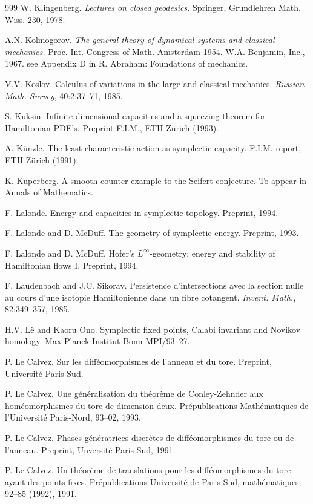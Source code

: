 \begin{thebibliography}{999}
 W. Klingenberg. \emph{Lectures on closed geodesics.}
Springer, Grundlehren Math. Wiss. 230, 1978.

 A.N. Kolmogorov. \emph{The general theory of dynamical
systems and classical mechanics.} Proc. Int. Congress of Math.
Amsterdam 1954. W.A. Benjamin, Inc., 1967. see Appendix D in R. Abraham:
Foundations of mechanics.

 V.V. Koslov. Calculus of variations in the large and
classical mechanics. \emph{Russian Math. Survey}, 40:2:37--71, 1985.

 S. Kuksin. Infinite-dimensional capacities and a squeezing
theorem for Hamiltonian PDE's. Preprint F.I.M., ETH Zürich (1993).

 A. Künzle. The least characteristic action as symplectic
capacity. F.I.M. report, ETH Zürich (1991).

 K. Kuperberg. A smooth counter example to the Seifert
conjecture. To appear in Annals of Mathematics.

 F. Lalonde. Energy and capacities in symplectic topology.
Preprint, 1994.

 F. Lalonde and D. McDuff. The geometry of symplectic
energy. Preprint, 1993.

 F. Lalonde and D. McDuff. Hofer's $L^\infty$-geometry:
energy and stability of Hamiltonian flows I. Preprint, 1994.

 F. Laudenbach and J.C. Sikorav. Persistence d'intersections
avec la section nulle au cours d'une isotopie Hamiltonienne dans un
fibre cotangent. \emph{Invent. Math.}, 82:349--357, 1985.

 H.V. Lê and Kaoru Ono. Symplectic fixed points, Calabi
invariant and Novikov homology. Max-Planck-Institut Bonn MPI/93--27.

 P. Le Calvez. Sur les difféomorphismes de l'anneau et du
tore. Preprint, Université Paris-Sud.

 P. Le Calvez. Une généralisation du théorème de
Conley-Zehnder aux homéomorphismes du tore de dimension deux.
Prépublications Mathématiques de l'Université Paris-Nord, 93--02, 1993.

 P. Le Calvez. Phases génératrices discrètes de
difféomorphismes du tore ou de l'anneau. Preprint, Unversité Paris-Sud,
1991.

 P. Le Calvez. Un théorème de translations pour les
difféomorphismes du tore ayant des points fixes. Prépublications
Université de Paris-Sud, mathématiques, 92--85 (1992), 1991.


\end{thebibliography}
